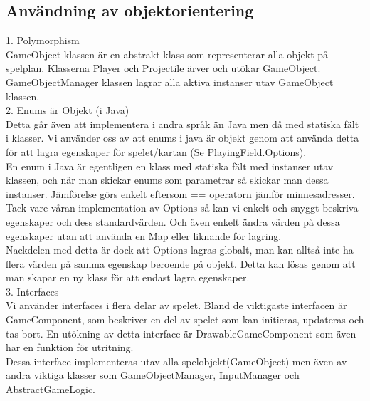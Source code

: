 \subsection{Användning av objektorientering}
1. Polymorphism\\
GameObject klassen är en abstrakt klass som representerar alla objekt på spelplan. Klasserna Player och Projectile ärver och utökar GameObject.\\
GameObjectManager klassen lagrar alla aktiva instanser utav GameObject klassen.\\
\vspace{11pt}
2. Enums är Objekt (i Java)\\
Detta går även att implementera i andra språk än Java men då med statiska fält i klasser.
Vi använder oss av att enums i java är objekt genom att använda detta för att lagra egenskaper för spelet/kartan (Se PlayingField.Options).\\
En enum i Java är egentligen en klass med statiska fält med instanser utav klassen, och när man skickar enums som parametrar så skickar man dessa instanser. Jämförelse görs enkelt eftersom == operatorn jämför minnesadresser.\\
Tack vare våran implementation av Options så kan vi enkelt och snyggt beskriva egenskaper och dess standardvärden. Och även enkelt ändra värden på dessa egenskaper utan att använda en Map eller liknande för lagring.\\
Nackdelen med detta är dock att Options lagras globalt, man kan alltså inte ha flera värden på samma egenskap beroende på objekt. Detta kan lösas genom att man skapar en ny klass för att endast lagra egenskaper.\\
\vspace{11pt}
3. Interfaces\\
Vi använder interfaces i flera delar av spelet. Bland de viktigaste interfacen är GameComponent, som beskriver en del av spelet som kan initieras, updateras och tas bort. En utökning av detta interface är DrawableGameComponent som även har en funktion för utritning.\\
Dessa interface implementeras utav alla spelobjekt(GameObject) men även av andra viktiga klasser som GameObjectManager, InputManager och AbstractGameLogic.\\
\pagebreak
